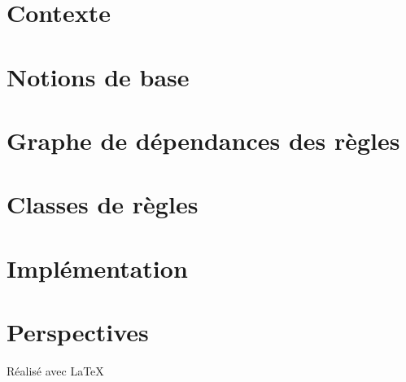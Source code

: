 \documentclass[a4paper]{report}
\begin{document}
\large
\setlength{\parskip}{5mm plus2mm minus2mm}
\lstset{language=Java, showstringspaces=false, numbers=left, numberstyle=\tiny, tabsize=4}




\chapter{Contexte}\label{contexte}


\chapter{Notions de base}\label{notions}


\chapter{Graphe de dépendances des règles}\label{grd}


\chapter{Classes de règles}\label{classes_regles}


\chapter{Implémentation}\label{implementation}


\chapter{Perspectives}\label{conclusion}


\vfill
{\raggedleft R\'ealis\'e avec \LaTeX{} \par}
\end{document}
